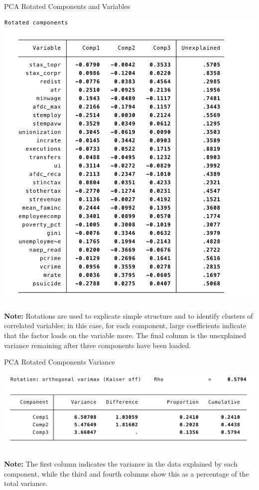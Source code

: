 \documentclass{article}
\begin{document}
\begin{table}[!hbtp]
\caption{PCA Rotated Components and Variables}
\includegraphics[width=15cm]{output/tables/pca_rotated_vars}
\\ \\
\textbf{Note:} Rotations are used to explicate simple structure and to identify clusters of correlated variables; in this case, for each component, large coefficients indicate that the factor loads on the variable more. The final column is the unexplained variance remaining after three components have been loaded.
\label{table:pca_rotated_vars}
\end{table}

\begin{table}[!hbtp]
\caption{PCA Rotated Components Variance}
\includegraphics[width=15cm]{output/tables/pca_rotated_comp}
\\ \\
\textbf{Note:} The first column indicates the variance in the data explained by each component, while the third and fourth columns show this as a percentage of the total variance.
\label{table:pca_rotated_comp}
\end{table}
\end{document}
